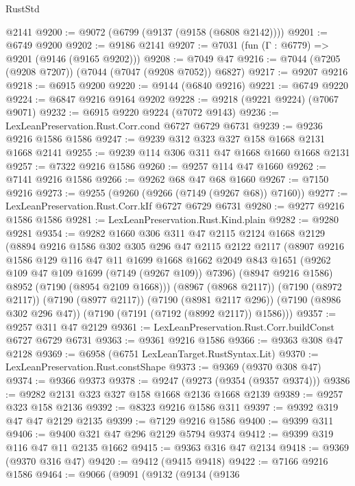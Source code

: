 \begin{lexlean}{RustStd}
\begin{coremodule}
    @2141
@9200 := @9072 (@6799 (@9137 (@9158 (@6808 @2142))))
@9201 := @6749 @9200
@9202 := @9186 @2141
@9207 := @7031 (fun (Γ : @6779) => @9201 (@9146 (@9165 @9202)))
@9208 := @7049 @47
@9216 := @7044 (@7205 (@9208 @7207)) (@7044 (@7047 (@9208 @7052)) @6827)
@9217 := @9207 @9216
@9218 := @6915 @9200
@9220 := @9144 (@6840 @9216)
@9221 := @6749 @9220
@9224 := @6847 @9216 @9164 @9202
@9228 := @9218 (@9221 @9224) (@7067 @9071)
@9232 := @6915 @9220 @9224 (@7072 @9143)
@9236 := LexLeanPreservation.Rust.Corr.cond @6727 @6729 @6731
@9239 := @9236 @9216 @1586 @1586
@9247 := @9239 @312 @323 @327 @158 @1668 @2131 @1668 @2141
@9255 := @9239 @114 @306 @311 @47 @1668 @1660 @1668 @2131
@9257 := @7322 @9216 @1586
@9260 := @9257 @114 @47 @1660
@9262 := @7141 @9216 @1586
@9266 := @9262 @68 @47 @68 @1660
@9267 := @7150 @9216
@9273 := @9255 (@9260 (@9266 (@7149 (@9267 @68)) @7160))
@9277 := LexLeanPreservation.Rust.Corr.kIf @6727 @6729 @6731
@9280 := @9277 @9216 @1586 @1586
@9281 := LexLeanPreservation.Rust.Kind.plain
@9282 := @9280 @9281
@9354 := @9282
    @1660
    @306
    @311
    @47
    @2115
    @2124
    @1668
    @2129
    (@8894
      @9216
      @1586
      @302
      @305
      @296
      @47
      @2115
      @2122
      @2117
      (@8907
        @9216
        @1586
        @129
        @116
        @47
        @11
        @1699
        @1668
        @1662
        @2049
        @843
        @1651
        (@9262 @109 @47 @109 @1699 (@7149 (@9267 @109)) @7396)
        (@8947 @9216 @1586)
        @8952
        (@7190 (@8954 @2109 @1668)))
      (@8967 (@8968 @2117))
      (@7190 (@8972 @2117))
      (@7190 (@8977 @2117))
      (@7190 (@8981 @2117 @296))
      (@7190 (@8986 @302 @296 @47))
      (@7190 (@7191 (@7192 (@8992 @2117)) @1586)))
@9357 := @9257 @311 @47 @2129
@9361 := LexLeanPreservation.Rust.Corr.buildConst @6727 @6729 @6731
@9363 := @9361 @9216 @1586
@9366 := @9363 @308 @47 @2128
@9369 := @6958 (@6751 LexLeanTarget.RustSyntax.Lit)
@9370 := LexLeanPreservation.Rust.constShape
@9373 := @9369 (@9370 @308 @47)
@9374 := @9366 @9373
@9378 := @9247 (@9273 (@9354 (@9357 @9374)))
@9386 := @9282 @2131 @323 @327 @158 @1668 @2136 @1668 @2139
@9389 := @9257 @323 @158 @2136
@9392 := @8323 @9216 @1586 @311
@9397 := @9392 @319 @47 @47 @2129 @2135
@9399 := @7129 @9216 @1586
@9400 := @9399 @311
@9406 := @9400 @321 @47 @296 @2129 @5794 @9374
@9412 := @9399 @319 @116 @47 @11 @2135 @1662
@9415 := @9363 @316 @47 @2134
@9418 := @9369 (@9370 @316 @47)
@9420 := @9412 (@9415 @9418)
@9422 := @7166 @9216 @1586
@9464 := @9066
    (@9091
      (@9132
        (@9134
          (@9136

\end{coremodule}
\end{lexlean}
